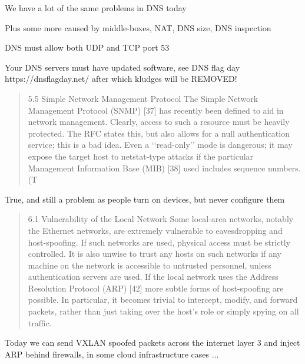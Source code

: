 \documentclass[Screen16to9,17pt]{foils}
\begin{document}
\begin{list1}
\item We have a lot of the same problems in DNS today
\item Plus some more caused by middle-boxes, NAT, DNS size, DNS inspection
\begin{list2}
\item DNS must allow both UDP and TCP port 53
\item Your DNS servers must have updated software, see DNS flag day\\ https://dnsflagday.net/ after which kludges will be REMOVED!
\end{list2}
\end{list1}


\begin{quote}
5.5 Simple Network Management Protocol
The Simple Network Management Protocol (SNMP) [37] has recently been defined to aid in network
management. Clearly, access to such a resource must be heavily protected. The RFC states this, but
also allows for a null authentication service; this is a bad idea. Even a ‘‘read-only’’ mode is dangerous;
it may expose the target host to netstat-type attacks if the particular Management Information Base
(MIB) [38] used includes sequence numbers. (T
\end{quote}

True, and still a problem as people turn on devices, but never configure them


\begin{quote}
6.1 Vulnerability of the Local Network
Some local-area networks, notably the Ethernet networks, are extremely vulnerable to eavesdropping and
host-spoofing. If such networks are used, physical access must be strictly controlled. It is also unwise
to trust any hosts on such networks if any machine on the network is accessible to untrusted personnel,
unless authentication servers are used.
If the local network uses the Address Resolution Protocol (ARP) [42] more subtle forms of host-spoofing
are possible. In particular, it becomes trivial to intercept, modify, and forward packets, rather than just
taking over the host’s role or simply spying on all traffic.
\end{quote}

Today we can send VXLAN spoofed packets across the internet layer 3 and inject ARP behind firewalls, in some cloud infrastructure cases ...
\end{document}
